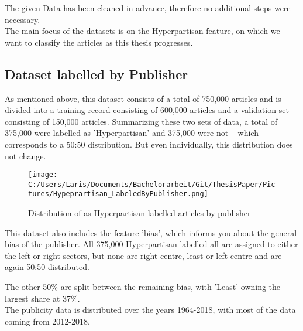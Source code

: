 \documentclass[11pt,titlepage,oneside,openany]{book}
\begin{document}
 \noindent The given Data has been cleaned in advance, therefore no additional steps were necessary.\\ 
 The main focus of the datasets is on the Hyperpartisan feature, on which we want to classify the articles as this thesis progresses.
 

\subsection{Dataset labelled by Publisher}
As mentioned above, this dataset consists of a total of 750,000 articles and is divided into a training record consisting of 600,000 articles and a validation set consisting of 150,000 articles. Summarizing these two sets of data, a total of 375,000 were labelled as 'Hyperpartisan' and 375,000 were not – which corresponds to a 50:50 distribution. But even individually, this distribution does not change. 
\begin{figure}[h]
	\centering
	\texttt{[image: C:/Users/Laris/Documents/Bachelorarbeit/Git/ThesisPaper/Pictures/Hypeprartisan\_LabeledByPublisher.png]}
	\caption{Distribution of as Hyperpartisan labelled articles by publisher}
	\label{fig:example}
\end{figure}

\noindent This dataset also includes the feature 'bias', which informs you about the general bias of the publisher. All 375,000 Hyperpartisan labelled all are assigned to either the left or right sectors, but none are right-centre, least or left-centre and are again 50:50 distributed.


\noindent The other 50\% are split between the remaining bias, with 'Least' owning the largest share at 37\%.\\
The publicity data is distributed over the years 1964-2018, with most of the data coming from 2012-2018.
\begin{figure}[h]
\end{figure}
\end{document}
